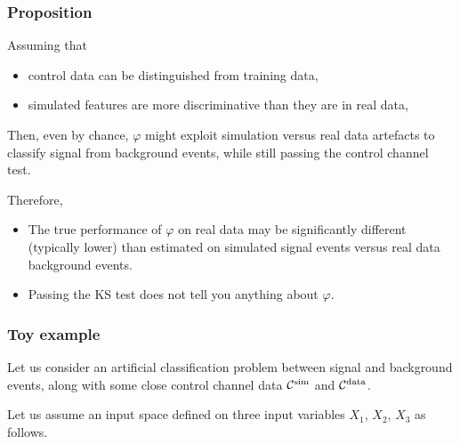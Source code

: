 \documentclass{beamer}
\begin{document}
\begin{frame}
  \frametitle{Proposition}

Assuming that
\begin{itemize}
\item control data can be distinguished from training data,
\item simulated features are more discriminative than they are in real data,
\end{itemize}

Then, even by chance, $\varphi$ might exploit simulation versus real data
artefacts to classify signal from background events, {\color{red}while still passing the
control channel test}.

\vspace{0.5cm}

Therefore,

\begin{itemize}

\item The true performance of $\varphi$ on real data may be significantly different
(typically lower) than estimated on simulated signal events versus real data
background events.

\item Passing the KS test does not tell you anything about $\varphi$.

\end{itemize}

\end{frame}

\begin{frame}
  \frametitle{Toy example}

Let us consider an artificial classification
problem between signal and background events, along with some close control
channel data ${\cal C}^\text{sim}$ and ${\cal C}^\text{data}$.

\vspace{0.5cm}

Let us assume an
input space defined on three input variables $X_1$, $X_2$, $X_3$ as follows.

\end{frame}
\end{document}

